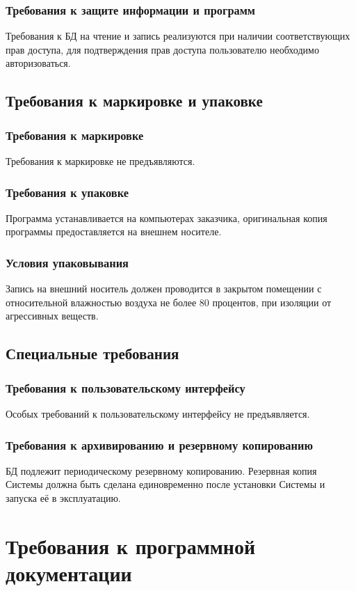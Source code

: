     \subsubsection{Требования к защите информации и программ}
      Требования к БД на чтение и запись реализуются при наличии соответствующих прав доступа, для подтверждения прав доступа пользователю необходимо авторизоваться.
  \subsection{Требования к маркировке и упаковке}
    \subsubsection{Требования к маркировке}
      Требования к маркировке не предъявляются.
    \subsubsection{Требования к упаковке}
      Программа устанавливается на компьютерах заказчика, оригинальная копия программы предоставляется на внешнем носителе.
    \subsubsection{Условия упаковывания}
      Запись на внешний носитель должен проводится в закрытом помещении с относительной влажностью воздуха не более 80 процентов, при изоляции от агрессивных веществ.
  \subsection{Специальные требования}
    \subsubsection{Требования к пользовательскому интерфейсу}
      Особых требований к пользовательскому интерфейсу не предъявляется.
    \subsubsection{Требования к архивированию и резервному копированию}
      БД подлежит периодическому резервному копированию. Резервная копия Системы должна быть сделана единовременно после установки Системы и запуска её в эксплуатацию.
\section{Требования к программной документации}
